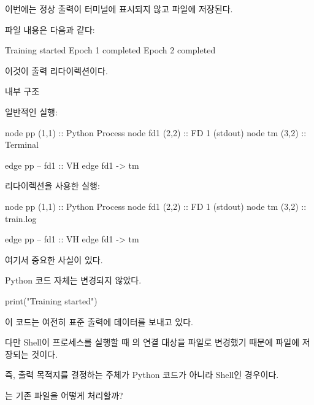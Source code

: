 이번에는 정상 출력이 터미널에 표시되지 않고  파일에 저장된다.

파일 내용은 다음과 같다:

\begin{dhkzsh}
Training started
Epoch 1 completed
Epoch 2 completed
\end{dhkzsh}

이것이 출력 리다이렉션이다.

\begin{dhknote}
\begin{dhksmry}[centered]
내부 구조
\end{dhksmry}
\end{dhknote}

일반적인 실행:

\begin{dhkdiagram}[in=6]
node pp (1,1) :: Python Process
node fd1 (2,2) :: FD 1 (stdout)
node tm (3,2) :: Terminal

edge pp -- fd1 :: VH
edge fd1 -> tm
\end{dhkdiagram}

리다이렉션을 사용한 실행:

\begin{dhkdiagram}[in=6]
node pp (1,1) :: Python Process
node fd1 (2,2) :: FD 1 (stdout)
node tm (3,2) :: train.log

edge pp -- fd1 :: VH
edge fd1 -> tm
\end{dhkdiagram}

여기서 중요한 사실이 있다.

\begin{dhksmry}[centered]
Python 코드 자체는 변경되지 않았다.
\end{dhksmry}

\begin{dhkcode}
print("Training started")
\end{dhkcode}

이 코드는 여전히 표준 출력에 데이터를 보내고 있다.

다만 Shell이 프로세스를 실행할 때 의 연결 대상을 파일로 변경했기 때문에 파일에 저장되는 것이다.

즉, 출력 목적지를 결정하는 주체가 Python 코드가 아니라 Shell인 경우이다.

\begin{dhknote}
\begin{dhksmry}[centered]
\zsh{>}는 기존 파일을 어떻게 처리할까?
\end{dhksmry}
\end{dhknote}

